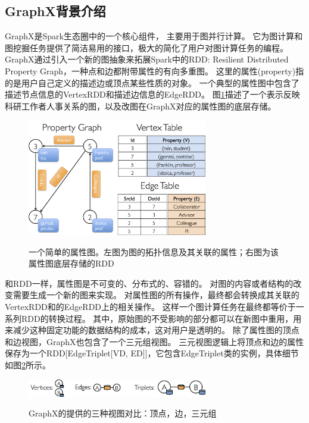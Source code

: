 \documentclass[master]{njuthesis}
\begin{document}
\subsection{GraphX背景介绍}
GraphX\cite{DBLP:conf/osdi/GonzalezXDCFS14}是Spark生态圈中的一个核心组件， 主要用于图并行计算。
它为图计算和图挖掘任务提供了简洁易用的接口，极大的简化了用户对图计算任务的编程。
GraphX通过引入一个新的图抽象来拓展Spark中的RDD: Resilient Distributed Property Graph，一种点和边都附带属性的有向多重图。
这里的属性(property)指的是用户自己定义的描述边或顶点某些性质的对象。
一个典型的属性图中包含了描述节点信息的VertexRDD和描述边信息的EdgeRDD。
图\ref{fig:property_graph}描述了一个表示反映科研工作者人事关系的图，以及改图在GraphX对应的属性图的底层存储。
\begin{figure}[h]
  \centering
  \includegraphics[width= 0.7\textwidth]{figure/property_graph.png}\\
  \caption{一个简单的属性图。左图为图的拓扑信息及其关联的属性；右图为该属性图底层存储的RDD}
  \label{fig:property_graph}
\end{figure}

和RDD一样，属性图是不可变的、分布式的、容错的。
对图的内容或者结构的改变需要生成一个新的图来实现。
对属性图的所有操作，最终都会转换成其关联的VertexRDD和的EdgeRDD上的相关操作。
这样一个图计算任务在最终都等价于一系列RDD的转换过程。
其中，原始图的不受影响的部分都可以在新图中重用，用来减少这种固定功能的数据结构的成本，这对用户是透明的。
除了属性图的顶点和边视图，GraphX也包含了一个三元组视图。
三元视图逻辑上将顶点和边的属性保存为一个RDD[EdgeTriplet[VD, ED]]，它包含EdgeTriplet类的实例，具体细节如图\ref{fig:triplet}所示。

\begin{figure}[h]
  \centering
  \includegraphics[width= 0.7\textwidth]{figure/triplet.png}\\
  \caption{GraphX的提供的三种视图对比：顶点，边，三元组}
  \label{fig:triplet}
\end{figure}
\end{document}
